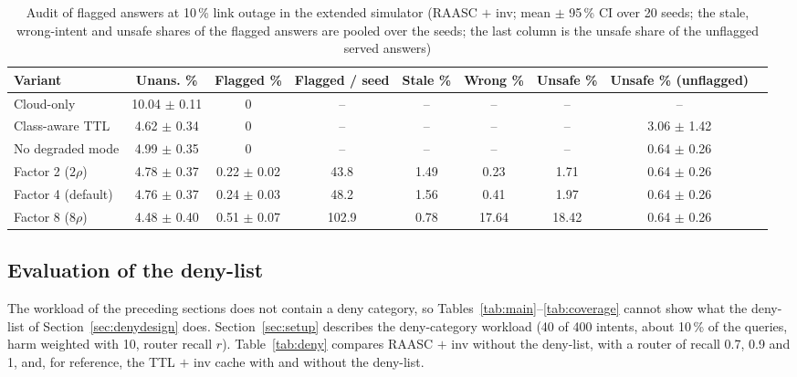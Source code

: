 \documentclass[journal]{IEEEtran}
\newcommand{\pct}{\,\%}
\begin{document}
\begin{table}[!t]
\caption{Audit of flagged answers at 10\pct{} link outage in the extended simulator (RAASC $+$ inv; mean $\pm$ 95\pct{} CI over 20 seeds; the stale, wrong-intent and unsafe shares of the flagged answers are pooled over the seeds; the last column is the unsafe share of the unflagged served answers)}
\label{tab:degaudit}
\centering\small
\begin{tabular}{lcccccccc}
\toprule
Variant & Unans. \% & Flagged \% & Flagged / seed & Stale \% & Wrong \% & Unsafe \% & Unsafe \% (unflagged)\\
\midrule
Cloud-only & 10.04 $\pm$ 0.11 & 0 & -- & -- & -- & -- & --\\
Class-aware TTL & 4.62 $\pm$ 0.34 & 0 & -- & -- & -- & -- & 3.06 $\pm$ 1.42\\
No degraded mode & 4.99 $\pm$ 0.35 & 0 & -- & -- & -- & -- & 0.64 $\pm$ 0.26\\
Factor 2 ($2\rho$) & 4.78 $\pm$ 0.37 & 0.22 $\pm$ 0.02 & 43.8 & 1.49 & 0.23 & 1.71 & 0.64 $\pm$ 0.26\\
Factor 4 (default) & 4.76 $\pm$ 0.37 & 0.24 $\pm$ 0.03 & 48.2 & 1.56 & 0.41 & 1.97 & 0.64 $\pm$ 0.26\\
Factor 8 ($8\rho$) & 4.48 $\pm$ 0.40 & 0.51 $\pm$ 0.07 & 102.9 & 0.78 & 17.64 & 18.42 & 0.64 $\pm$ 0.26\\
\bottomrule
\end{tabular}
\end{table}

\subsection{Evaluation of the deny-list}\label{sec:denylist}
The workload of the preceding sections does not contain a deny category, so Tables~\ref{tab:main}--\ref{tab:coverage} cannot show what the deny-list of Section~\ref{sec:denydesign} does. Section~\ref{sec:setup} describes the deny-category workload (40 of 400 intents, about 10\pct{} of the queries, harm weighted with 10, router recall $r$). Table~\ref{tab:deny} compares RAASC $+$ inv without the deny-list, with a router of recall 0.7, 0.9 and 1, and, for reference, the TTL $+$ inv cache with and without the deny-list.
\end{document}
